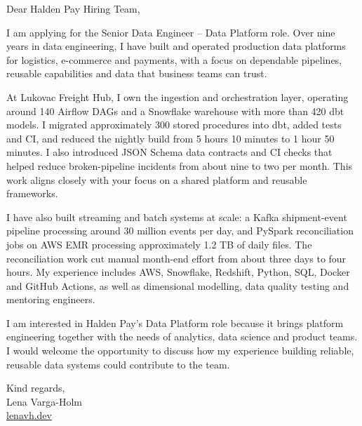 \documentclass[11pt,a4paper]{article}
\begin{document}
Dear Halden Pay Hiring Team,

I am applying for the Senior Data Engineer -- Data Platform role. Over nine years in data engineering, I have built and operated production data platforms for logistics, e-commerce and payments, with a focus on dependable pipelines, reusable capabilities and data that business teams can trust.

At Lukovac Freight Hub, I own the ingestion and orchestration layer, operating around 140 Airflow DAGs and a Snowflake warehouse with more than 420 dbt models. I migrated approximately 300 stored procedures into dbt, added tests and CI, and reduced the nightly build from 5 hours 10 minutes to 1 hour 50 minutes. I also introduced JSON Schema data contracts and CI checks that helped reduce broken-pipeline incidents from about nine to two per month. This work aligns closely with your focus on a shared platform and reusable frameworks.

I have also built streaming and batch systems at scale: a Kafka shipment-event pipeline processing around 30 million events per day, and PySpark reconciliation jobs on AWS EMR processing approximately 1.2 TB of daily files. The reconciliation work cut manual month-end effort from about three days to four hours. My experience includes AWS, Snowflake, Redshift, Python, SQL, Docker and GitHub Actions, as well as dimensional modelling, data quality testing and mentoring engineers.

I am interested in Halden Pay’s Data Platform role because it brings platform engineering together with the needs of analytics, data science and product teams. I would welcome the opportunity to discuss how my experience building reliable, reusable data systems could contribute to the team.

Kind regards,\\
Lena Varga-Holm\\
\href{https://lenavh.dev}{lenavh.dev}
\end{document}
